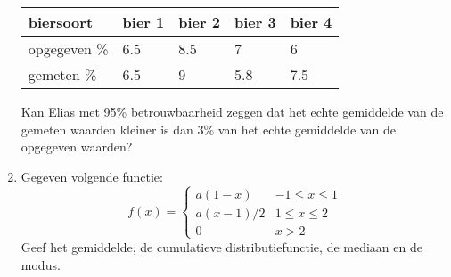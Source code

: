 \documentclass{article}
\begin{document}
\begin{enumerate}
  \begin{tabular}{l | l | l | l | l}
  biersoort  & bier 1 & bier 2 & bier 3 & bier 4 \\
  \hline
  opgegeven \% & 6.5 & 8.5 & 7 & 6  \\

  gemeten \%  & 6.5 & 9 & 5.8 & 7.5
   
  \end{tabular}
  
  Kan Elias met 95\% betrouwbaarheid zeggen dat het echte gemiddelde van de gemeten waarden kleiner is dan 3\% van het echte gemiddelde van de opgegeven waarden?

  
  \item Gegeven volgende functie:   $$f(x) = \begin{cases}
                                            a(1 - x)   & -1 \leq x \le 1 \\
                                            a(x - 1)/2 & 1 \leq x \leq 2 \\
                                            0          & x > 2
                                            
                                           \end{cases}
                                    $$
        Geef het gemiddelde, de cumulatieve distributiefunctie, de mediaan en de modus.
 \end{enumerate}
\end{document}
